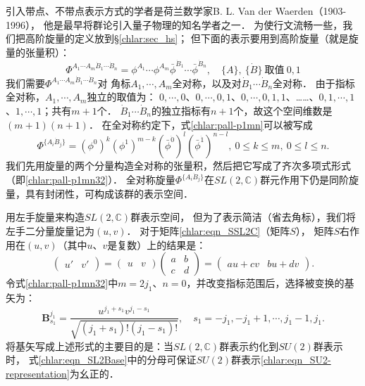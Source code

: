 引入带点、不带点表示方式的学者是荷兰数学家B. L. Van der Waerden（1903-1996），
他是最早将群论引入量子物理的知名学者之一．
为使行文流畅一些，我们把高阶旋量的定义放到\S\ref{chlar:sec_hs}；
但下面的表示要用到高阶旋量（就是旋量的张量积）：
\begin{equation}\label{chlar:pall-p1mn}
    \Phi^{A_1 \cdots A_m \dot{B}_1 \cdots \dot{B}_n} = 
    \phi^{A_1} \cdots \phi^{A_m} \bar{\phi}^{\dot{B}_1} \cdots \bar{\phi}^{\dot{B}_n} , \quad 
    \{A\},\ \{\dot{B}\} \ \text{取值}\ 0, 1
\end{equation}
我们需要$\Phi^{A_1 \cdots A_m \dot{B}_1 \cdots \dot{B}_n}$对
{\kaishu 角标$A_1,\cdots,A_m$全对称，以及对$\dot{B}_1 \cdots \dot{B}_n$全对称}．
由于指标全对称，$A_1,\cdots,A_m$独立的取值为：
$0,\cdots,0$、$0,\cdots,0,1$、$0,\cdots,0,1,1$、……、$0,1,\cdots,1$、$1,\cdots,1$；共有$m+1$个．
$\dot{B}_1 \cdots \dot{B}_n$的独立指标有$n+1$个，故这个空间维数是$(m+1)(n+1)$．
在全对称约定下，式\eqref{chlar:pall-p1mn}可以被写成
\begin{equation}\label{chlar:pall-p1mn32}
    \Phi^{\{A_i \dot{B}_j\}} = \left( \phi^{0}\right)^k \left( \phi^{1}\right)^{m-k}  
    \left( \bar{\phi}^{\dot{0}}\right)^l \left( \bar{\phi}^{\dot{1}}\right)^{n-l} , 
    \ 0 \leqslant k \leqslant m,\  0 \leqslant l \leqslant n.
\end{equation}
我们先用旋量的两个分量构造全对称的张量积，然后把它写成了齐次多项式形式（即\eqref{chlar:pall-p1mn32}）．
全对称旋量$\Phi^{\{A_i \dot{B}_j\}}$在$SL(2,\mathbb{C})$群元作用下仍是同阶旋量，具有封闭性，可构成该群的表示空间．


用左手旋量来构造$SL(2,\mathbb{C})$群表示空间，
但为了表示简洁（省去角标），我们将左手二分量旋量记为$(u,v)$．
对于矩阵\eqref{chlar:eqn_SSL2C}（矩阵$S$），
矩阵$S$右作用在$(u,v)$（其中$u$、$v$是复数）上的结果是：
\begin{equation}
    \begin{pmatrix} u'& v' \end{pmatrix} =
    \begin{pmatrix} u & v \end{pmatrix}
    \begin{pmatrix} a & b  \\ c & d \end{pmatrix}
    =\begin{pmatrix} au+cv & bu+dv \end{pmatrix}.
\end{equation}
令式\eqref{chlar:pall-p1mn32}中$m=2j_1$、$n=0$，并改变指标范围后，选择被变换的基矢为：
\begin{equation}\label{chlar:eqn_SL2Base}
    \boldsymbol{B}^{j_1}_{s_1} = \frac{u^{j_1+s_1} v^{j_1-s_1}}{\sqrt{(j_1+s_1)!(j_1-s_1)!}},\quad
    s_1 = -j_1, -j_1 +1, \cdots, j_1 -1, j_1 .
\end{equation}
将基矢写成上述形式的主要目的是：当$SL(2,\mathbb{C})$群表示约化到$SU(2)$群表示时，
式\eqref{chlar:eqn_SL2Base}中的分母可保证$SU(2)$群表示\eqref{chlar:eqn_SU2-representation}为幺正的．

